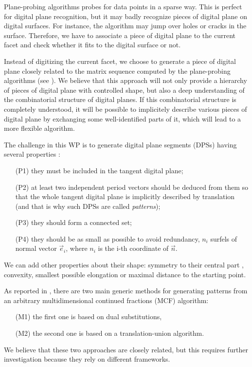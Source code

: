 Plane-probing algorithms probes for data points in a sparse way.
This is perfect for digital plane recognition, but it may badly
recognize pieces of digital plane on digital surfaces. For
instance, the algorithm may jump over holes or cracks in the
surface. Therefore, we have to associate a piece of digital plane
to the current facet and check whether it fits to the digital surface
or not.

Instead of digitizing the current facet, we choose to generate a piece
of digital plane closely related to the matrix sequence computed by
the plane-probing algorithms (see ). We believe that
this approach will not only provide a hierarchy of pieces of digital
plane with controlled shape, but also a deep understanding of the
combinatorial structure of digital planes. If this combinatorial
structure is completely understood, it will be possible to implicitely
describe various pieces of digital plane by exchanging some well-identified
parts of it, which will lead to a more flexible algorithm. 

The challenge in this WP is to generate digital plane segments (DPSs)
having several properties \cite{Jamet2016}:
\begin{enumerate}
\item[(P1)] they must be included in the tangent digital plane;
\item[(P2)] at least two independent period vectors should be deduced from them
  so that the whole tangent digital plane is implicitly described by translation
  (and that is why such DPSs are called \emph{patterns});
\item[(P3)] they should form a connected set;
\item[(P4)] they should be as small as possible to avoid redundancy,
  \eg $n_i$ surfels of normal vector $\vec{e}_i$, where $n_i$ is the i-th coordinate
  of $\vec{n}$. 
\end{enumerate}
We can add other properties about their shape: symmetry to their central part \cite{Labbe2015},
convexity, smallest possible elongation or maximal distance to the starting point.

As reported in , there are two main generic methods for generating patterns
from an arbitrary multidimensional continued fractions (MCF) algorithm:
\begin{itemize}
\item[(M1)] the first one is based on dual substitutions, 
\item[(M2)] the second one is based on a translation-union algorithm.
\end{itemize}
We believe that these two approaches are closely related, but this requires
further investigation because they rely on different frameworks. 


